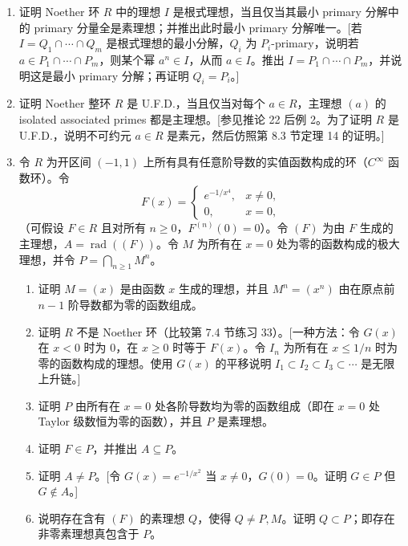 \begin{enumerate}[label=\arabic*.]
	\item 证明 Noether 环 $R$ 中的理想 $I$ 是根式理想，当且仅当其最小 primary 分解中的 primary 分量全是素理想；并推出此时最小 primary 分解唯一。[若 $I=Q_1\cap\cdots\cap Q_m$ 是根式理想的最小分解，$Q_i$ 为 $P_i$-primary，说明若 $a\in P_1\cap\cdots\cap P_m$，则某个幂 $a^n\in I$，从而 $a\in I$。推出 $I=P_1\cap\cdots\cap P_m$，并说明这是最小 primary 分解；再证明 $Q_i=P_i$。]
	
	\item 证明 Noether 整环 $R$ 是 U.F.D.，当且仅当对每个 $a\in R$，主理想 $(a)$ 的 isolated associated primes 都是主理想。[参见推论 22 后例 2。为了证明 $R$ 是 U.F.D.，说明不可约元 $a\in R$ 是素元，然后仿照第 8.3 节定理 14 的证明。]
	
	\item 令 $R$ 为开区间 $(-1,1)$ 上所有具有任意阶导数的实值函数构成的环（$C^\infty$ 函数环）。令
	\[
	F(x)=
	\begin{cases}
		e^{-1/x^4},&x\ne0,\\
		0,&x=0,
	\end{cases}
	\]
	（可假设 $F\in R$ 且对所有 $n\ge0$，$F^{(n)}(0)=0$）。令 $(F)$ 为由 $F$ 生成的主理想，$A=\operatorname{rad}((F))$。令 $M$ 为所有在 $x=0$ 处为零的函数构成的极大理想，并令 $P=\bigcap_{n\ge1}M^n$。
	\begin{enumerate}[label=(\alph*)]
		\item 证明 $M=(x)$ 是由函数 $x$ 生成的理想，并且 $M^n=(x^n)$ 由在原点前 $n-1$ 阶导数都为零的函数组成。
		\item 证明 $R$ 不是 Noether 环（比较第 7.4 节练习 33）。[一种方法：令 $G(x)$ 在 $x<0$ 时为 $0$，在 $x\ge0$ 时等于 $F(x)$。令 $I_n$ 为所有在 $x\le1/n$ 时为零的函数构成的理想。使用 $G(x)$ 的平移说明 $I_1\subset I_2\subset I_3\subset\cdots$ 是无限上升链。]
		\item 证明 $P$ 由所有在 $x=0$ 处各阶导数均为零的函数组成（即在 $x=0$ 处 Taylor 级数恒为零的函数），并且 $P$ 是素理想。
		\item 证明 $F\in P$，并推出 $A\subseteq P$。
		\item 证明 $A\ne P$。[令 $G(x)=e^{-1/x^2}$ 当 $x\ne0$，$G(0)=0$。证明 $G\in P$ 但 $G\notin A$。]
		\item 说明存在含有 $(F)$ 的素理想 $Q$，使得 $Q\ne P,M$。证明 $Q\subset P$；即存在非零素理想真包含于 $P$。
	\end{enumerate}
	

\end{enumerate}
